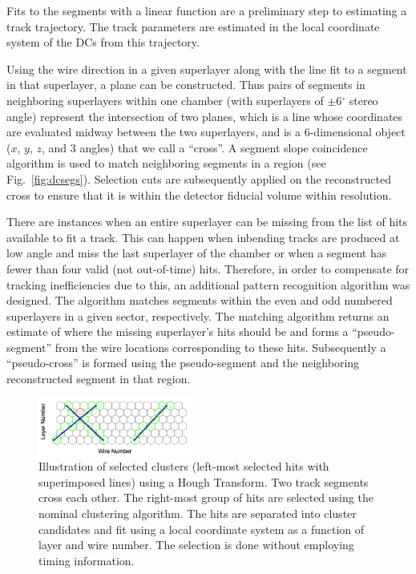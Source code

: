 Fits to the segments with a linear function are a preliminary step to estimating a track trajectory. The track
parameters are estimated in the local coordinate system of the DCs from this trajectory.

Using the wire direction in a given superlayer along with the line fit to a segment in that superlayer, a plane can
be constructed. Thus pairs of segments in neighboring superlayers within one chamber (with superlayers of
$\pm$6$^\circ$ stereo angle) represent the intersection of two planes, which is a line whose coordinates are
evaluated midway between the two superlayers, and is a 6-dimensional object ($x$, $y$, $z$, and 3 angles) that
we call a ``cross''. A segment slope coincidence algorithm is used to match neighboring segments in a region (see
Fig.~\ref{fig:dcsegs}).  Selection cuts are subsequently applied on the reconstructed cross to ensure that it is
within the detector fiducial volume within resolution.

There are instances when an entire superlayer can be missing from the list of hits available to fit a track. This can
happen when inbending tracks are produced at low angle and miss the last superlayer of the chamber or when a
segment has fewer than four valid (not out-of-time) hits. Therefore, in order to compensate for tracking inefficiencies
due to this, an additional pattern recognition algorithm was designed.  The algorithm matches segments within the even
and odd numbered superlayers in a given sector, respectively. The matching algorithm returns an estimate of where the
missing superlayer's hits should be and forms a ``pseudo-segment'' from the wire locations corresponding to these
hits. Subsequently a ``pseudo-cross'' is formed using the pseudo-segment and the neighboring reconstructed segment
in that region.

\begin{figure}
\includegraphics[width=0.45\textwidth]{pics/dcPattern14.png}
\caption{Illustration of selected clusters (left-most selected hits with superimposed lines) using a Hough Transform.
  Two track segments cross each other. The right-most group of hits are selected using the nominal clustering algorithm.
  The hits are separated into cluster candidates and fit using a local coordinate system as a function of layer and wire
  number. The selection is done without employing timing information.}
\label{fig:hough}
\end{figure}

